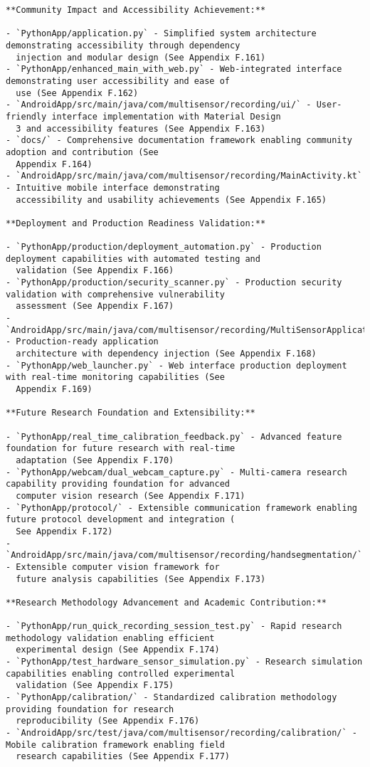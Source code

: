 \documentclass[12pt,a4paper]{report}
\begin{document}
\begin{verbatim}
**Community Impact and Accessibility Achievement:**

- `PythonApp/application.py` - Simplified system architecture demonstrating accessibility through dependency
  injection and modular design (See Appendix F.161)
- `PythonApp/enhanced_main_with_web.py` - Web-integrated interface demonstrating user accessibility and ease of
  use (See Appendix F.162)
- `AndroidApp/src/main/java/com/multisensor/recording/ui/` - User-friendly interface implementation with Material Design
  3 and accessibility features (See Appendix F.163)
- `docs/` - Comprehensive documentation framework enabling community adoption and contribution (See
  Appendix F.164)
- `AndroidApp/src/main/java/com/multisensor/recording/MainActivity.kt` - Intuitive mobile interface demonstrating
  accessibility and usability achievements (See Appendix F.165)

**Deployment and Production Readiness Validation:**

- `PythonApp/production/deployment_automation.py` - Production deployment capabilities with automated testing and
  validation (See Appendix F.166)
- `PythonApp/production/security_scanner.py` - Production security validation with comprehensive vulnerability
  assessment (See Appendix F.167)
- `AndroidApp/src/main/java/com/multisensor/recording/MultiSensorApplication.kt` - Production-ready application
  architecture with dependency injection (See Appendix F.168)
- `PythonApp/web_launcher.py` - Web interface production deployment with real-time monitoring capabilities (See
  Appendix F.169)

**Future Research Foundation and Extensibility:**

- `PythonApp/real_time_calibration_feedback.py` - Advanced feature foundation for future research with real-time
  adaptation (See Appendix F.170)
- `PythonApp/webcam/dual_webcam_capture.py` - Multi-camera research capability providing foundation for advanced
  computer vision research (See Appendix F.171)
- `PythonApp/protocol/` - Extensible communication framework enabling future protocol development and integration (
  See Appendix F.172)
- `AndroidApp/src/main/java/com/multisensor/recording/handsegmentation/` - Extensible computer vision framework for
  future analysis capabilities (See Appendix F.173)

**Research Methodology Advancement and Academic Contribution:**

- `PythonApp/run_quick_recording_session_test.py` - Rapid research methodology validation enabling efficient
  experimental design (See Appendix F.174)
- `PythonApp/test_hardware_sensor_simulation.py` - Research simulation capabilities enabling controlled experimental
  validation (See Appendix F.175)
- `PythonApp/calibration/` - Standardized calibration methodology providing foundation for research
  reproducibility (See Appendix F.176)
- `AndroidApp/src/test/java/com/multisensor/recording/calibration/` - Mobile calibration framework enabling field
  research capabilities (See Appendix F.177)


\end{verbatim}
\end{document}
